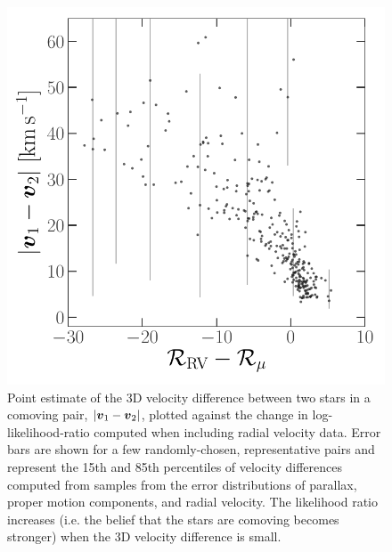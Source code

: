 \documentclass[modern, letterpaper]{aastex61}
\begin{document}
\begin{figure}[htbp]
  \begin{center}
    \includegraphics[width=0.7\linewidth]{llr-vs-dv.pdf}
  \end{center}
  \caption{%
    Point estimate of the 3D velocity difference between two stars in a comoving
    pair, $|\boldsymbol{v}_1 - \boldsymbol{v}_2|$, plotted against the change in
    log-likelihood-ratio computed when including radial velocity data.
    Error bars are shown for a few randomly-chosen, representative pairs and
    represent the 15th and 85th percentiles of velocity differences computed
    from samples from the error distributions of parallax, proper motion
    components, and radial velocity.
    The likelihood ratio increases (i.e. the belief that the stars are comoving
    becomes stronger) when the 3D velocity difference is small.
    \label{fig:llr}}
\end{figure}
\end{document}
